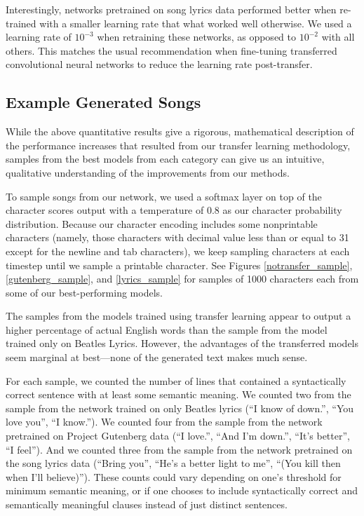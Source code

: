 \documentclass[10pt,twocolumn,letterpaper]{article}
\begin{document}
	Interestingly, networks pretrained on song lyrics data performed better when re-trained with a smaller learning rate that what worked well otherwise. We used a learning rate of $10^{-3}$ when retraining these networks, as opposed to $10^{-2}$ with all others. This matches the usual recommendation when fine-tuning transferred convolutional neural networks to reduce the learning rate post-transfer.
	
	\subsection{Example Generated Songs}
		While the above quantitative results give a rigorous, mathematical description of the performance increases that resulted from our transfer learning methodology, samples from the best models from each category can give us an intuitive, qualitative understanding of the improvements from our methods.
		
		To sample songs from our network, we used a softmax layer on top of the character scores output with a temperature of 0.8 as our character probability distribution. Because our character encoding includes some nonprintable characters (namely, those characters with decimal value less than or equal to 31 except for the newline and tab characters), we keep sampling characters at each timestep until we sample a printable character. See Figures \ref{notransfer_sample}, \ref{gutenberg_sample}, and \ref{lyrics_sample} for samples of 1000 characters each from some of our best-performing models.
		
		The samples from the models trained using transfer learning appear to output a higher percentage of actual English words than the sample from the model trained only on Beatles Lyrics. However, the advantages of the transferred models seem marginal at best---none of the generated text makes much sense.
		
		For each sample, we counted the number of lines that contained a syntactically correct sentence with at least some semantic meaning. We counted two from the sample from the network trained on only Beatles lyrics (``I know of down.'', ``You love you'', ``I know.''). We counted four from the sample from the network pretrained on Project Gutenberg data (``I love.'', ``And I'm down.'', ``It's better'', ``I feel''). And we counted three from the sample from the network pretrained on the song lyrics data (``Bring you'', ``He's a better light to me'', ``(You kill then when I'll believe)''). These counts could vary depending on one's threshold for minimum semantic meaning, or if one chooses to include syntactically correct and semantically meaningful clauses instead of just distinct sentences.
		
\end{document}
